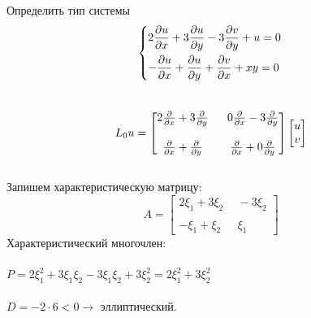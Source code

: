 \documentclass[../main.tex]{subfiles}
\begin{document}
\begin{example}
    Определить тип системы
    $$
    \begin{dcases}
    2\frac{\partial u}{\partial x} + 3\frac{\partial u}{\partial y}-3\frac{\partial v}{\partial y}+u=0 \\
    -\frac{\partial u}{\partial x} + \frac{\partial u}{\partial y}+\frac{\partial v}{\partial x}+xy=0
    \end{dcases} \\ 
    $$ \\ 
    $$L_{0}u = \begin{bmatrix}
    2\frac{\partial }{\partial x}+3\frac{\partial }{\partial y} \ & \ 0\frac{\partial }{\partial x}-3\frac{\partial }{\partial y} \\ \\
    \frac{\partial }{\partial x}+\frac{\partial }{\partial y}\ & \ \frac{\partial }{\partial x} + 0\frac{\partial }{\partial y} 
    \end{bmatrix}\begin{bmatrix}
    u \\ v
    \end{bmatrix}$$ \\
    Запишем характеристическую матрицу:
    $$A = \begin{bmatrix}
    2\xi_1+3\xi_2 \ & \ -3\xi_2 \\ \\
    -\xi_1 + \xi_2 \  & \ \xi_1 
    \end{bmatrix}$$
    Характеристический многочлен:\\ \\
    $P = 2\xi_1^2 + 3\xi_1\xi_2-3\xi_1\xi_2+3\xi_2^2=2\xi_1^2+3\xi_2^2$ \\ \\
    $D = -2\cdot6<0\rightarrow $ эллиптический.
\end{example}
\end{document}
